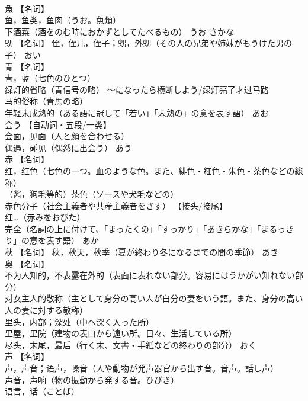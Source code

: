 \documentclass[8pt]{extreport}
\begin{document}
\begin{CJK}{UTF8}{min}
\\	魚	【名词】 
\\	鱼，鱼类，鱼肉（うお。魚類） 
\\	下酒菜（酒をのむ時におかずとしてたべるもの）	うお さかな	
\\	甥	【名词】 侄，侄儿，侄子；甥，外甥（その人の兄弟や姉妹がもうけた男の子）	おい	
\\	青	【名词】 
\\	青，蓝（七色のひとつ） 
\\	绿灯的省略（青信号の略） 〜になったら横断しよう/绿灯亮了才过马路 
\\	马的俗称（青馬の略） 
\\	年轻未成熟的（ある語に冠して「若い」「未熟の」の意を表す語）	あお	
\\	会う	【自动词・五段/一类】 
\\	会面，见面（人と顔を合わせる） 
\\	偶遇，碰见（偶然に出会う）	あう	
\\	赤	【名词】 
\\	红，红色（七色の一つ。血のような色。また、緋色・紅色・朱色・茶色などの総称） 
\\	（酱，狗毛等的）茶色（ソースや犬毛などの） 
\\	赤色分子（社会主義者や共産主義者をさす） 【接头/接尾】 
\\	红…（赤みをおびた） 
\\	完全（名詞の上に付けて、「まったくの」「すっかり」「あきらかな」「まるっきり」の意を表す語）	あか	
\\	秋	【名词】 秋，秋天，秋季（夏が終わり冬になるまでの間の季節）	あき	
\\	奥	【名词】 
\\	不为人知的，不表露在外的（表面に表れない部分。容易にはうかがい知れない部分） 
\\	对女主人的敬称（主として身分の高い人が自分の妻をいう語。また、身分の高い人の妻に対する敬称） 
\\	里头，内部；深处（中へ深く入った所） 
\\	里屋，里院（建物の表口から遠い所。日々、生活している所） 
\\	尽头，末尾，最后（行く末、文書・手紙などの終わりの部分）	おく	
\\	声	【名词】 
\\	声，声音；语声，嗓音（人や動物が発声器官から出す音。音声。話し声） 
\\	声音，声响（物の振動から発する音。ひびき） 
\\	语言，话（ことば） 

\end{CJK}
\end{document}
